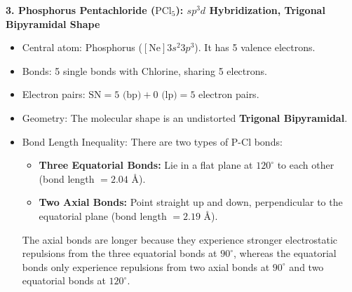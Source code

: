 \documentclass[12pt,a4paper]{article}
\begin{document}
\textbf{3. Phosphorus Pentachloride ($\text{PCl}_5$): $sp^3d$ Hybridization, Trigonal Bipyramidal Shape}
\begin{itemize}[leftmargin=*, itemsep=1pt]
  \item Central atom: Phosphorus ($[\text{Ne}]3s^2 3p^3$). It has 5 valence electrons.
  \item Bonds: 5 single bonds with Chlorine, sharing 5 electrons.
  \item Electron pairs: $\text{SN} = 5\text{ (bp)} + 0\text{ (lp)} = 5$ electron pairs.
  \item Geometry: The molecular shape is an undistorted \textbf{Trigonal Bipyramidal}.
  \item Bond Length Inequality: There are two types of $\text{P-Cl}$ bonds:
    \begin{itemize}
      \item \textbf{Three Equatorial Bonds:} Lie in a flat plane at $120^\circ$ to each other (bond length $= 2.04\text{ \AA}$).
      \item \textbf{Two Axial Bonds:} Point straight up and down, perpendicular to the equatorial plane (bond length $= 2.19\text{ \AA}$).
    \end{itemize}
    The axial bonds are longer because they experience stronger electrostatic repulsions from the three equatorial bonds at $90^\circ$, whereas the equatorial bonds only experience repulsions from two axial bonds at $90^\circ$ and two equatorial bonds at $120^\circ$.
\end{itemize}
\end{document}
